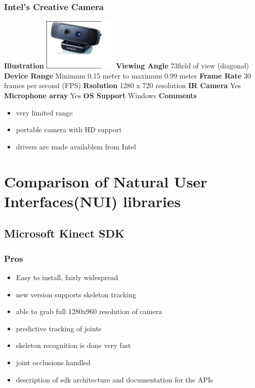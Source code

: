 \documentclass[a4paper,10pt]{report}
\begin{document}
\subsubsection{Intel's Creative Camera}
\textbf{Illustration}\newline
\includegraphics{./intel.png}
\newline
\textbf{Viewing Angle} 73\textdegree field of view (diagonal)\newline
\textbf{Device Range} Minimum 0.15 meter to maximum 0.99 meter\newline
\textbf{Frame Rate} 30 frames per second (FPS)\newline
\textbf{Rsolution} 1280 x 720 resolution \newline
\textbf{IR Camera} Yes\newline
\textbf{Microphone array} Yes\newline
\textbf{OS Support} Windows\newline
\textbf{Comments}
\begin{itemize}
 \item very limited range
 \item portable camera with HD support
 \item drivers are made availablem from Intel
\end{itemize}



\section{Comparison of Natural User Interfaces(NUI) libraries}

\subsection{Microsoft Kinect SDK}
\subsubsection{Pros}
\begin{itemize}
 \item Easy to install, fairly widespread
 \item new version supports skeleton tracking
 \item able to grab full 1280x960 resolution of camera
 \item predictive tracking of joints
 \item skeleton recognition is done very fast
 \item joint occlusions handled
 \item description of sdk architecture and documentation for the APIs
\end{itemize}
\end{document}
